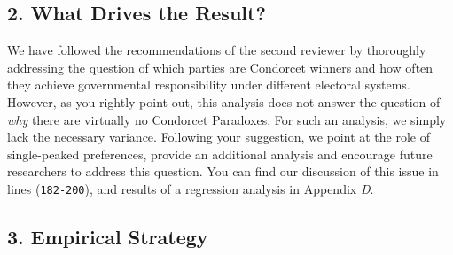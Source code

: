 \documentclass[a4paper, 12pt]{scrartcl}
\begin{document}
\subsection*{2. What Drives the Result?}
We have followed the recommendations of the second reviewer by thoroughly addressing the question of which parties are Condorcet winners and how often they achieve governmental responsibility under different electoral systems. However, as you rightly point out, this analysis does not answer the question of \textit{why} there are virtually no Condorcet Paradoxes. For such an analysis, we simply lack the necessary variance. Following your suggestion, we point at the role of single-peaked preferences, provide an additional analysis and encourage future researchers to address this question. You can find our discussion of this issue in lines (\texttt{182-200}), and results of a regression analysis in Appendix \textit{D}.

\subsection*{3. Empirical Strategy}
\end{document}
